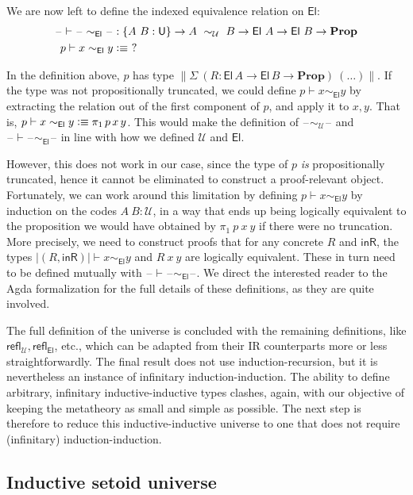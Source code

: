 \documentclass[autoref]{llncs}
\newcommand{\setoidU}{\mathcal{U}}
\newcommand{\mProp}{\mathbf{Prop}}
\newcommand{\U}{\textsf{U}}
\newcommand{\El}{\textsf{El}}
\newcommand{\reflu}{\textsf{refl}_\setoidU}
\newcommand{\reflel}{\textsf{refl}_\El}
\newcommand{\blank}{\mathord{\hspace{1pt}\text{--}\hspace{1pt}}}
\newcommand{\defeq}{\mathrel{\vcentcolon\equiv}}
\begin{document}
We are now left to define the indexed equivalence relation on $\El$:
{\small\vspace{-0.2em}
\begin{align*}
  \blank\vdash\blank\sim_{\El}\blank & : \{A\ B : \U\} \to A\ \sim_{\setoidU}\ B \to \El\ A \to \El\ B \to \mProp \\
  p \vdash x \sim_{\El} y & \defeq \ ?
\end{align*}}\vspace{-1em}

In the definition above, $p$ has type $\| \Sigma\ (R: \El\,A \to \El\,B \to
\mProp)\ (\ldots) \|$. If the type was not propositionally truncated, we could define
$p \vdash x \sim_{\El} y$ by extracting the relation out of the first component
of $p$, and apply it to $x, y$. That is, $p \vdash x \sim_{\El} y \defeq
\pi_1\,p\,x\,y$. This would make the definition of $\blank\sim_\setoidU\blank$ and
$\blank\vdash\blank\sim_{\El}\blank$ in line with how we defined $\setoidU$ and $\El$.

However, this does not work in our case, since the type of $p$ \emph{is}
propositionally truncated, hence it cannot be eliminated to construct a
proof-relevant object.
%
Fortunately, we can work around this limitation by defining $p \vdash x
\sim_{\El} y$ by induction on the codes $A\ B : \setoidU$, in a way that ends
up being logically equivalent to the proposition we would have obtained by
$\pi_1\ p\ x\ y$ if there were no truncation.
%
More precisely, we need to construct proofs that for any concrete $R$ and
$\mathsf{inR}$, the types $| (R, \mathsf{inR}) | \vdash x \sim_{\El} y$ and $R\ x\ y$
are logically equivalent. These in turn need to be defined mutually with
$\blank\vdash\blank\sim_{\El}\blank$. We direct the interested reader to the Agda
formalization for the full details of these definitions, as they are quite
involved.

The full definition of the universe is concluded with the remaining definitions,
like $\reflu, \reflel$, etc., which can be adapted from their IR counterparts
more or less straightforwardly. The final result does not use
induction-recursion, but it is nevertheless an instance of infinitary
induction-induction. The ability to define arbitrary, infinitary
inductive-inductive types clashes, again, with our objective of keeping the
metatheory as small and simple as possible. The next step is therefore to reduce
this inductive-inductive universe to one that does not require (infinitary)
induction-induction.

\subsection{Inductive setoid universe}
\end{document}
